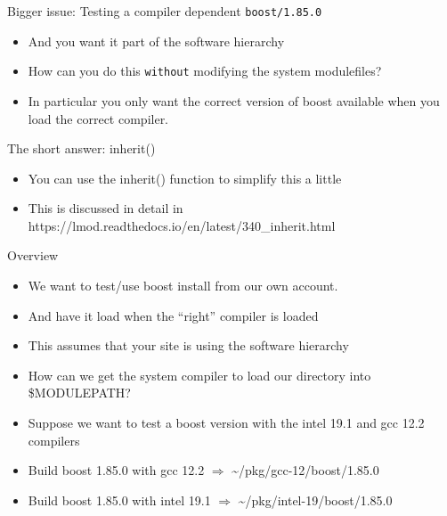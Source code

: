 \documentclass{beamer}
\begin{document}
\begin{frame}{Bigger issue: Testing a compiler dependent \texttt{boost/1.85.0}}
  \begin{itemize}
    \item And you want it part of the software hierarchy
    \item How can you do this \texttt{without} modifying the system
      modulefiles?
    \item In particular you only want the correct version of boost
      available when you load the correct compiler.
  \end{itemize}
\end{frame}

\begin{frame}{The short answer: inherit()}
  \begin{itemize}
    \item You can use the inherit() function to simplify this a little
    \item This is discussed in detail in https://lmod.readthedocs.io/en/latest/340_inherit.html
  \end{itemize}
\end{frame}

\begin{frame}{Overview}
  \begin{itemize}
    \item We want to test/use boost install from our own account.
    \item And have it load when the ``right'' compiler is loaded
    \item This assumes that your site is using the software hierarchy
    \item How can we get the system compiler to load our directory
      into \$MODULEPATH?
    \item Suppose we want to test a boost version with the intel 19.1
      and gcc 12.2 compilers
  \end{itemize}
\end{frame}

\begin{frame}{}
  \begin{itemize}
    \item Build boost 1.85.0 with gcc 12.2 $\Rightarrow$ \textasciitilde/pkg/gcc-12/boost/1.85.0
    \item Build boost 1.85.0 with intel 19.1 $\Rightarrow$ \textasciitilde/pkg/intel-19/boost/1.85.0
  \end{itemize}
\end{frame}
\end{document}
